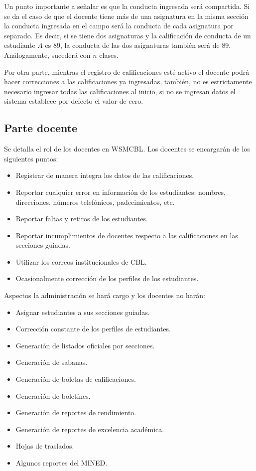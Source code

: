 \documentclass[12pt]{article}
\begin{document}
    Un punto importante a señalar es que la conducta ingresada será compartida.
    Si se da el caso de que el docente tiene más de una asignatura en la misma sección la conducta ingresada en el campo
    será la conducta de cada asignatura por separado.
    Es decir, si se tiene dos asignaturas y la calificación de conducta de un estudiante $A$ es 89, la conducta de las
    dos asignaturas también será de 89.
    Análogamente, sucederá con $n$ clases.

    Por otra parte, mientras el registro de calificaciones esté activo el docente podrá hacer correcciones a las calificaciones
    ya ingresadas, también, no es estrictamente necesario ingresar todas las calificaciones al inicio, si no se ingresan datos
    el sistema establece por defecto el valor de cero.

    \subsection{Parte docente}
    
    Se detalla el rol de los docentes en WSMCBL.
    Los docentes se encargarán de los siguientes puntos:
    \begin{itemize}
        \item Registrar de manera íntegra los datos de las calificaciones.
        \item Reportar cualquier error en información de los estudiantes: nombres, direcciones, números telefónicos, padecimientos, etc.
        \item Reportar faltas y retiros de los estudiantes.
        \item Reportar incumplimientos de docentes respecto a las calificaciones en las secciones guiadas.
        \item Utilizar los correos institucionales de CBL.
        \item Ocasionalmente corrección de los perfiles de los estudiantes.
    \end{itemize}

    Aspectos la administración se hará cargo y los docentes no harán:
    \begin{itemize}
        \item Asignar estudiantes a sus secciones guiadas.
        \item Corrección constante de los perfiles de estudiantes.
        \item Generación de listados oficiales por secciones.
        \item Generación de sabanas.
        \item Generación de boletas de calificaciones.
        \item Generación de boletínes.
        \item Generación de reportes de rendimiento.
        \item Generación de reportes de excelencia académica.
        \item Hojas de traslados.
        \item Algunos reportes del MINED.
    \end{itemize}
\end{document}
